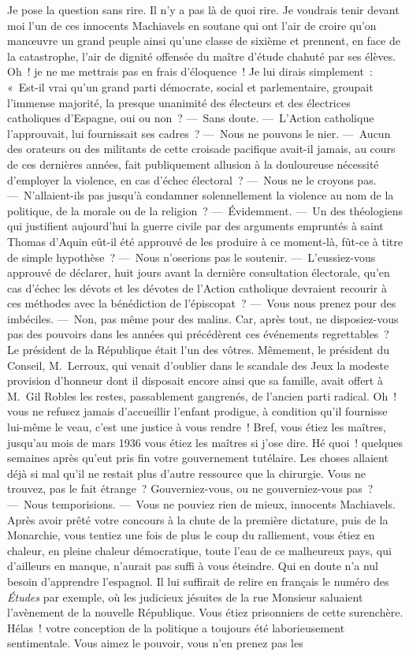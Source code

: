 \documentclass[french,twoside]{book} %
\begin{document}
\noindent Je pose la question sans rire. Il n’y a pas là de quoi rire. Je voudrais tenir devant moi l’un de ces innocents Machiavels en soutane qui ont l’air de croire qu’on manœuvre un grand peuple ainsi qu’une classe de sixième et prennent, en face de la catastrophe, l’air de dignité offensée du maître d’étude chahuté par ses élèves. Oh ! je ne me mettrais pas en frais d’éloquence ! Je lui dirais simplement : « Est-il vrai qu’un grand parti démocrate, social et parlementaire, groupait l’immense majorité, la presque unanimité des électeurs et des électrices catholiques d’Espagne, oui ou non ? — Sans doute. — L’Action catholique l’approuvait, lui fournissait ses cadres ? — Nous ne pouvons le nier. — Aucun des orateurs ou des militants de cette croisade pacifique avait-il jamais, au cours de ces dernières années, fait publiquement allusion à la douloureuse nécessité d’employer la violence, en cas d’échec électoral ? — Nous ne le croyons pas. — N’allaient-ils pas jusqu’à condamner solennellement la violence au nom de la politique, de la morale ou de la religion ? — Évidemment. — Un des théologiens qui justifient aujourd’hui la guerre civile par des arguments empruntés à saint Thomas d’Aquin eût-il été approuvé de les produire à ce moment-là, fût-ce à titre de simple hypothèse ? — Nous n’oserions pas le soutenir. — L’eussiez-vous approuvé de déclarer, huit jours avant la dernière consultation électorale, qu’en cas d’échec les dévots et les dévotes de l’Action catholique devraient recourir à ces méthodes avec la bénédiction de l’épiscopat ? — Vous nous prenez pour des imbéciles. — Non, pas même pour des malins. Car, après tout, ne disposiez-vous pas des pouvoirs dans les années qui précédèrent ces événements regrettables ? Le président de la République était l’un des vôtres. Mêmement, le président du Conseil, M. Lerroux, qui venait d’oublier dans le scandale des Jeux la modeste provision d’honneur dont il disposait encore ainsi que sa famille, avait offert à M. Gil Robles les restes, passablement gangrenés, de l’ancien parti radical. Oh ! vous ne refusez jamais d’accueillir l’enfant prodigue, à condition qu’il fournisse lui-même le veau, c’est une justice à vous rendre ! Bref, vous étiez les maîtres, jusqu’au mois de mars 1936 vous étiez les maîtres si j’ose dire. Hé quoi ! quelques semaines après qu’eut pris fin votre gouvernement tutélaire. Les choses allaient déjà si mal qu’il ne restait plus d’autre ressource que la chirurgie. Vous ne trouvez, pas le fait étrange ? Gouverniez-vous, ou ne gouverniez-vous pas ? — Nous temporisions. — Vous ne pouviez rien de mieux, innocents Machiavels. Après avoir prêté votre concours à la chute de la première dictature, puis de la Monarchie, vous tentiez une fois de plus le coup du ralliement, vous étiez en chaleur, en pleine chaleur démocratique, toute l’eau de ce malheureux pays, qui d’ailleurs en manque, n’aurait pas suffi à vous éteindre. Qui en doute n’a nul besoin d’apprendre l’espagnol. Il lui suffirait de relire en français le numéro des \emph{Études} par exemple, où les judicieux jésuites de la rue Monsieur saluaient l’avènement de la nouvelle République. Vous étiez prisonniers de cette surenchère. Hélas ! votre conception de la politique a toujours été laborieusement sentimentale. Vous aimez le pouvoir, vous n’en prenez pas les 
\end{document}
